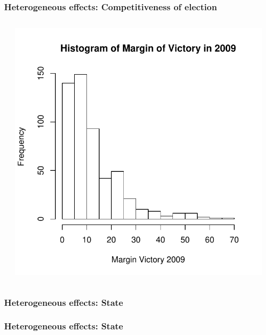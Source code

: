 \documentclass{beamer}
\begin{document}
\begin{frame}
\frametitle{Heterogeneous effects: Competitiveness of election}
\begin{columns}[T] %
\begin{column}{.38\textwidth}
\scalebox{.6}{
\vbox{%
\vspace{-40pt}
 }}
\end{column}%
\hfill%
\begin{column}{.58\textwidth}
\vspace{-10pt}
\includegraphics[scale=.5]{../Figures/histcomp.pdf}
\end{column}%
\end{columns}
\end{frame}


\begin{frame}
\frametitle{Heterogeneous effects: State}
\end{frame}

\begin{frame}
\frametitle{Heterogeneous effects: State}
\begin{columns}[T] %
\begin{column}{.40\textwidth}
\scalebox{.6}{
\vbox{%
\vspace{-40pt}
}}
\end{column}%
\hfill%
\begin{column}{.48\textwidth}
\scalebox{.6}{
\vbox{%
\vspace{-40pt}
}}
\end{column}%
\end{columns}
\end{frame}
\end{document}
